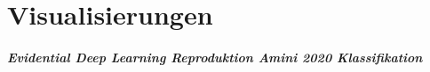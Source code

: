 \chapter*{Visualisierungen}
\label{chap:visualisierungen}

\paragraph{Evidential Deep Learning Reproduktion Amini 2020 Klassifikation}
\label{sec:visualisierungen_edl_amini2020_classification}







